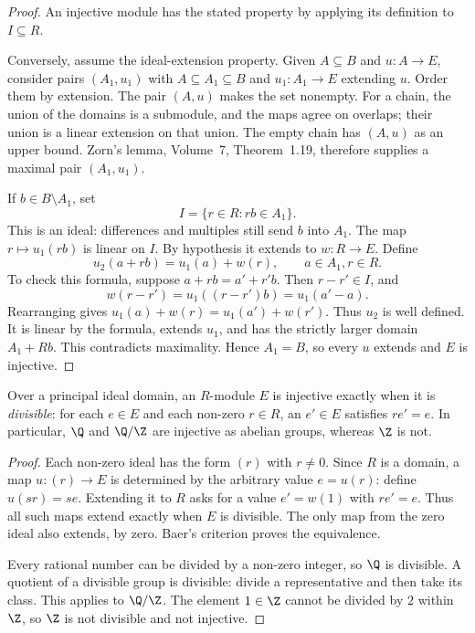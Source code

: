 \begin{proof}
An injective module has the stated property by applying its definition to $I\subseteq R$.

Conversely, assume the ideal-extension property. Given $A\subseteq B$ and $u\colon A\to E$, consider pairs $(A_1,u_1)$ with $A\subseteq A_1\subseteq B$ and $u_1\colon A_1\to E$ extending $u$. Order them by extension. The pair $(A,u)$ makes the set nonempty. For a chain, the union of the domains is a submodule, and the maps agree on overlaps; their union is a linear extension on that union. The empty chain has $(A,u)$ as an upper bound. Zorn's lemma, Volume~7, Theorem~1.19, therefore supplies a maximal pair $(A_1,u_1)$.

If $b\in B\setminus A_1$, set
\[
I=\{r\in R:rb\in A_1\}.
\]
This is an ideal: differences and multiples still send $b$ into $A_1$. The map $r\mapsto u_1(rb)$ is linear on $I$. By hypothesis it extends to $w\colon R\to E$. Define
\[
u_2(a+rb)=u_1(a)+w(r),\qquad a\in A_1, r\in R.
\]
To check this formula, suppose $a+rb=a'+r'b$. Then $r-r'\in I$, and
\[
w(r-r')=u_1((r-r')b)=u_1(a'-a).
\]
Rearranging gives $u_1(a)+w(r)=u_1(a')+w(r')$. Thus $u_2$ is well defined. It is linear by the formula, extends $u_1$, and has the strictly larger domain $A_1+Rb$. This contradicts maximality. Hence $A_1=B$, so every $u$ extends and $E$ is injective.
\end{proof}

\begin{corollary}\label{cor:divisible}
Over a principal ideal domain, an $R$-module $E$ is injective exactly when it is \emph{divisible}: for each $e\in E$ and each non-zero $r\in R$, an $e'\in E$ satisfies $re'=e$. In particular, $\Q$ and $\Q/\Z$ are injective as abelian groups, whereas $\Z$ is not.
\end{corollary}

\begin{proof}
Each non-zero ideal has the form $(r)$ with $r\ne0$. Since $R$ is a domain, a map $u\colon(r)\to E$ is determined by the arbitrary value $e=u(r)$: define $u(sr)=se$. Extending it to $R$ asks for a value $e'=w(1)$ with $re'=e$. Thus all such maps extend exactly when $E$ is divisible. The only map from the zero ideal also extends, by zero. Baer's criterion proves the equivalence.

Every rational number can be divided by a non-zero integer, so $\Q$ is divisible. A quotient of a divisible group is divisible: divide a representative and then take its class. This applies to $\Q/\Z$. The element $1\in\Z$ cannot be divided by $2$ within $\Z$, so $\Z$ is not divisible and not injective.
\end{proof}

